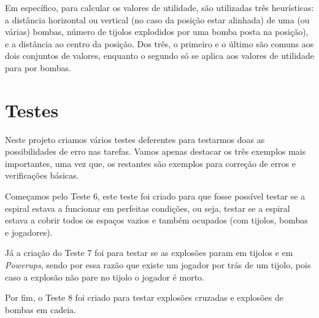 \documentclass[a4paper]{report}
\begin{document}
Em específico, para calcular os valores de utilidade, são utilizadas três heurísticas: a distância horizontal ou vertical (no caso da posição estar alinhada) de uma (ou várias) bombas, número de tijolos explodidos por uma bomba posta na posição), e a distância ao centro da posição. Dos três, o primeiro e o último são comuns aos dois conjuntos de valores, enquanto o segundo só se aplica aos valores de utilidade para por bombas.

\section{Testes}
Neste projeto criamos vários testes deferentes para testarmos doas as possibilidades de erro nas tarefas. Vamos apenas destacar os três exemplos mais importantes, uma vez que, os restantes são exemplos para correção de erros e verificações básicas.

Começamos pelo Teste 6, este teste foi criado para que fosse possível testar se a espiral estava a funcionar em perfeitas condições, ou seja, testar se a espiral estava a cobrir todos os espaços vazios e também ocupados (com tijolos, bombas e jogadores).

Já a criação do Teste 7 foi para testar se as explosões param em tijolos e em \textit{Powerups}, sendo por essa razão que existe um jogador por trás de um tijolo, pois caso a explosão não pare no tijolo o jogador é morto.

Por fim, o Teste 8 foi criado para testar explosões cruzadas e explosões de bombas em cadeia. 
\end{document}
